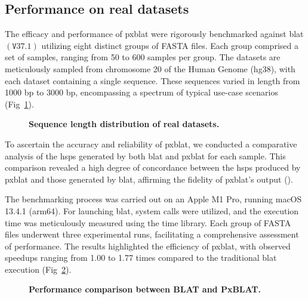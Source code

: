 \documentclass[10pt,letterpaper]{article}
\begin{document}
\subsection*{Performance on real datasets}

The efficacy and performance of \gls{pxblat} were rigorously benchmarked against \gls{blat} \(\left(\mathtt{V}37.1\right)\) utilizing eight distinct groups of FASTA files.
Each group comprised a set of samples, ranging from 50 to 600 samples per group.
The datasets are meticulously sampled from chromosome 20 of the Human Genome (hg38), with each dataset containing a single sequence.
These sequences varied in length from \num{1000} bp to \num{3000} bp, encompassing a spectrum of typical use-case scenarios (Fig~\ref{fig:fas_len}).

\begin{figure}[!h]
	\caption{{\bf Sequence length distribution of real datasets.}}
	\label{fig:fas_len}
\end{figure}

To ascertain the accuracy and reliability of \gls{pxblat}, we conducted a comparative analysis of the \glspl{hsp} generated by both \gls{blat} and \gls{pxblat} for each sample.
This comparison revealed a high degree of concordance between the \glspl{hsp} produced by \gls{pxblat} and those generated by \gls{blat}, affirming the fidelity of \gls{pxblat}'s output ().

The benchmarking process was carried out on an Apple M1 Pro, running macOS 13.4.1 (arm64).
For launching \gls{blat}, system calls were utilized, and the execution time was meticulously measured using the time library.
Each group of FASTA files underwent three experimental runs, facilitating a comprehensive assessment of performance.
The results highlighted the efficiency of \gls{pxblat}, with observed speedups ranging from 1.00 to 1.77 times compared to the traditional \gls{blat} execution (Fig~\ref{fig:performance}).

\begin{figure}[!h]
	\caption{{\bf Performance comparison between BLAT and PxBLAT.}}
	\label{fig:performance}
\end{figure}
\end{document}

